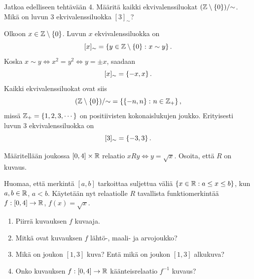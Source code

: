 \documentclass[11pt,a4paper]{amsart}
\begin{document}
\begin{exercise}
Jatkoa edelliseen tehtävään 4. Määritä kaikki ekvivalenssiluokat
\((\mathbb{Z} \setminus \left\lbrace0\right\rbrace)/{\sim}\). Mikä on luvun \(3\) ekvivalenssiluokka
\([3]_{\sim}\)?
\end{exercise}

\begin{solution}
Olkoon \(x \in \mathbb{Z} \setminus \left\lbrace0\right\rbrace\). Luvun \(x\) ekvivalenssiluokka on
\[
[x]_{\sim} = \left\lbrace y \in \mathbb{Z} \setminus \left\lbrace0\right\rbrace \colon x \sim y\right\rbrace.
\]
Koska \(x \sim y \iff x^2 = y^2 \iff y = \pm x\), saadaan
\[
[x]_{\sim} = \left\lbrace-x, x\right\rbrace.
\]
Kaikki ekvivalenssiluokat ovat siis
\[
(\mathbb{Z} \setminus \left\lbrace0\right\rbrace)/{\sim}
= \left\lbrace\left\lbrace-n, n\right\rbrace \colon n \in \mathbb{Z}_{+}\right\rbrace,
\]
missä \(\mathbb{Z}_{+} = \left\lbrace1, 2, 3, \cdots\right\rbrace\) on positiivisten kokonaislukujen
joukko. Erityisesti luvun \(3\) ekvivalenssiluokka on
\[
[3]_{\sim} = \left\lbrace-3, 3\right\rbrace.
\]
\end{solution}

\begin{exercise}
Määritellään joukossa \([0, 4] \times \mathbb{R}\) relaatio
\(xRy \iff y = \sqrt{x}\). Osoita, että \(R\) on kuvaus.

Huomaa, että merkintä \([a, b]\) tarkoittaa suljettua väliä
\(\left\lbrace x \in \mathbb{R} : a \leq x \leq b\right\rbrace\), kun \(a, b \in \mathbb{R}\), \(a < b\).
Käytetään nyt relaatiolle \(R\) tavallista funktiomerkintää
\(f : [0, 4] \to \mathbb{R}\), \(f(x) = \sqrt{x}\).
\begin{enumerate}[label=\alph*), nosep]
\item Piirrä kuvauksen \(f\) kuvaaja.
\item Mitkä ovat kuvauksen \(f\) lähtö-, maali- ja arvojoukko?
\item Mikä on joukon \([1, 3]\) kuva? Entä mikä on joukon \([1, 3]\) alkukuva?
\item Onko kuvauksen \(f : [0, 4] \to \mathbb{R}\) käänteisrelaatio \(f^{-1}\) kuvaus?
\end{enumerate}
\end{exercise}
\end{document}
